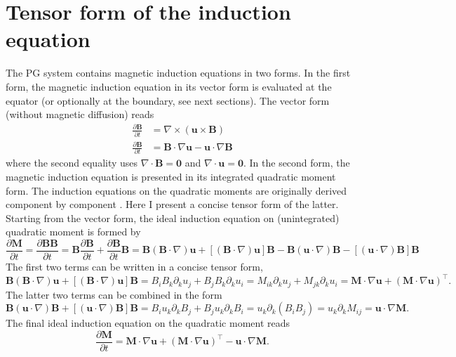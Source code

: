\section{Tensor form of the induction equation}

The PG system contains magnetic induction equations in two forms. 
In the first form, the magnetic induction equation in its vector form is evaluated at the equator (or optionally at the boundary, see next sections). The vector form (without magnetic diffusion) reads
\[\begin{aligned}
    \frac{\partial \mathbf{B}}{\partial t} &= \nabla\times (\mathbf{u}\times \mathbf{B}) \\ 
    \frac{\partial \mathbf{B}}{\partial t} &= \mathbf{B}\cdot \nabla \mathbf{u} - \mathbf{u}\cdot \nabla \mathbf{B}
\end{aligned}
\]
where the second equality uses $\nabla\cdot \mathbf{B} = \mathbf{0}$ and $\nabla\cdot \mathbf{u} = \mathbf{0}$.
In the second form, the magnetic induction equation is presented in its integrated quadratic moment form.
The induction equations on the quadratic moments are originally derived component by component \citep{jackson_plesio-geostrophy_2020}.
Here I present a concise tensor form of the latter. Starting from the vector form, the ideal induction equation on (unintegrated) quadratic moment is formed by
\begin{equation}
    \frac{\partial \mathbf{M}}{\partial t} = \frac{\partial \mathbf{B}\mathbf{B}}{\partial t} = \mathbf{B} \frac{\partial \mathbf{B}}{\partial t} + \frac{\partial \mathbf{B}}{\partial t} \mathbf{B} 
    = \mathbf{B} (\mathbf{B}\cdot \nabla) \mathbf{u} + \left[(\mathbf{B}\cdot \nabla)\mathbf{u}\right] \mathbf{B} - \mathbf{B}(\mathbf{u}\cdot \nabla) \mathbf{B} - \left[(\mathbf{u}\cdot \nabla)\mathbf{B}\right]\mathbf{B}
\end{equation}
The first two terms can be written in a concise tensor form,
\[
    \mathbf{B} (\mathbf{B}\cdot \nabla) \mathbf{u} + \left[(\mathbf{B}\cdot \nabla)\mathbf{u}\right] \mathbf{B} = B_i B_k \partial_k u_j + B_j B_k \partial_k u_i = M_{ik} \partial_k u_j + M_{jk} \partial_k u_i = \mathbf{M}\cdot \nabla \mathbf{u} + (\mathbf{M}\cdot \nabla \mathbf{u})^\top.
\]
The latter two terms can be combined in the form
\[
    \mathbf{B}(\mathbf{u}\cdot \nabla) \mathbf{B} + \left[(\mathbf{u}\cdot \nabla)\mathbf{B}\right]\mathbf{B} = B_i u_k \partial_k B_j + B_j u_k \partial_k B_i = u_k \partial_k (B_i B_j) = u_k \partial_k M_{ij} = \mathbf{u}\cdot \nabla\mathbf{M}.
\]
The final ideal induction equation on the quadratic moment reads
\begin{equation}\label{eqn:tensor-induction}
    \frac{\partial \mathbf{M}}{\partial t} = \mathbf{M}\cdot \nabla \mathbf{u} + (\mathbf{M}\cdot \nabla \mathbf{u})^\top - \mathbf{u}\cdot \nabla\mathbf{M}.
\end{equation}

